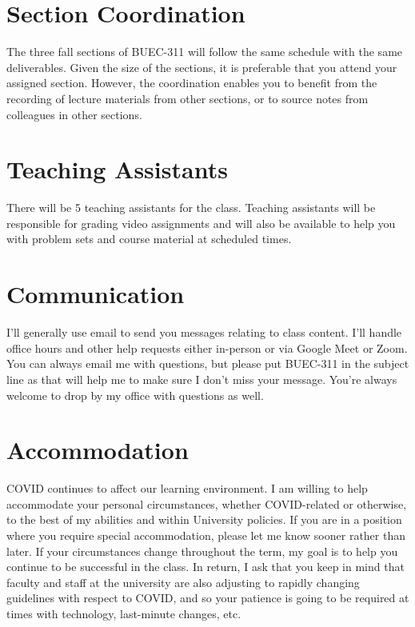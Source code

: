\documentclass[11pt,]{article}
\begin{document}
\hypertarget{section-coordination}{%
\section{Section Coordination}\label{section-coordination}}

The three fall sections of BUEC-311 will follow the same schedule with
the same deliverables. Given the size of the sections, it is preferable
that you attend your assigned section. However, the coordination enables you to benefit from the recording of lecture materials from other sections, or to source notes from colleagues in other sections.

\hypertarget{teaching-assistants}{%
\section{Teaching Assistants}\label{teaching-assistants}}

There will be 5 teaching assistants for the class. Teaching assistants will be responsible for grading video assignments and will also be available to help you with problem sets and course material at scheduled
times. 

\hypertarget{communication}{%
\section{Communication}\label{communication}}

I'll generally use email to send you messages relating to class content. I'll handle office hours and other
help requests either in-person or via Google Meet or Zoom. You can
always email me with questions, but please put BUEC-311 in the subject
line as that will help me to make sure I don't miss your message. You're always welcome to drop by my office with questions as well.

\hypertarget{covid-times}{%
\section{Accommodation}\label{covid-times}}
COVID continues to affect our learning environment. I am willing to help accommodate your personal circumstances, whether COVID-related or otherwise, to the best of my abilities and within University policies. If you are in a position where you require special accommodation, please let me know sooner
rather than later. If your circumstances change throughout the term, my
goal is to help you continue to be successful in the class. In return, I
ask that you keep in mind that faculty and staff at the university are
also adjusting to rapidly changing guidelines with respect to COVID, and so your patience is going to be
required at times with technology, last-minute changes, etc. 
\end{document}
